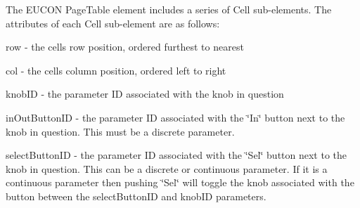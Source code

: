 The E\+U\+C\+ON {\ttfamily Page\+Table} element includes a series of {\ttfamily Cell} sub-\/elements. The attributes of each {\ttfamily Cell} sub-\/element are as follows\+: 
\begin{DoxyItemize}
\item {\ttfamily row} -\/ the cell\textquotesingle{}s row position, ordered furthest to nearest  
\item {\ttfamily col} -\/ the cell\textquotesingle{}s column position, ordered left to right  
\item {\ttfamily knob\+ID} -\/ the parameter ID associated with the knob in question 
\item {\ttfamily in\+Out\+Button\+ID} -\/ the parameter ID associated with the \char`\"{}\+In\char`\"{} button next to the knob in question. This must be a discrete parameter. 
\item {\ttfamily select\+Button\+ID} -\/ the parameter ID associated with the \char`\"{}\+Sel\char`\"{} button next to the knob in question. This can be a discrete or continuous parameter. If it is a continuous parameter then pushing \char`\"{}\+Sel\char`\"{} will toggle the knob associated with the button between the {\ttfamily select\+Button\+ID} and {\ttfamily knob\+ID} parameters. 
\end{DoxyItemize}

